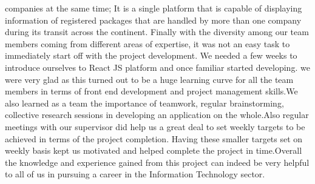 companies at the same time; It is a single platform that is capable of displaying information of registered packages that are handled by more than one company during its transit across the continent.
Finally with the diversity among our team members coming from different areas of expertise, it was not an easy task to immediately start off with the project development. We needed a few weeks to introduce ourselves to React JS platform and once familiar started developing. we were very glad as this turned out to be a huge learning curve for all the team members in terms of front end development and project management skills.We also learned as a team the importance of teamwork, regular brainstorming, collective research sessions in developing an application on the whole.Also regular meetings with our supervisor did help us a great deal to set weekly targets to be achieved in terms of the project completion. Having these smaller targets set on weekly basis kept us motivated and helped complete the project in time.Overall the knowledge and experience gained from this project can indeed be very helpful to all of us in pursuing a career in the Information Technology sector. 
